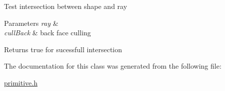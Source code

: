 Test intersection between shape and ray 
\begin{DoxyParams}{Parameters}
{\em ray} & \\
\hline
{\em cull\+Back} & back face culling \\
\hline
\end{DoxyParams}
\begin{DoxyReturn}{Returns}
true for sucessfull intersection 
\end{DoxyReturn}


The documentation for this class was generated from the following file\+:\begin{DoxyCompactItemize}
\item 
\mbox{\hyperlink{primitive_8h}{primitive.\+h}}\end{DoxyCompactItemize}
